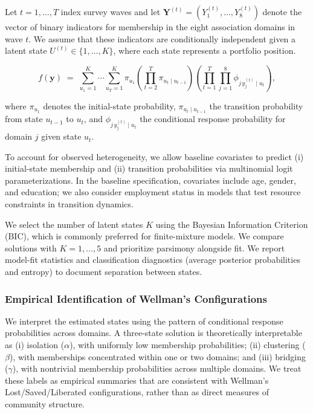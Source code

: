 Let $t=1,\ldots,T$ index survey waves and let $\mathbf{Y}^{(t)}=(Y^{(t)}_{1},\ldots,Y^{(t)}_{8})$ denote the vector of binary indicators for membership in the eight association domains in wave $t$. We assume that these indicators are conditionally independent given a latent state $U^{(t)}\in\{1,\ldots,K\}$, where each state represents a portfolio position.

\begin{equation}
f(\mathbf{y}) \;=\; \sum_{u_1=1}^{K} \cdots \sum_{u_T=1}^{K}
\pi_{u_1}\left(\prod_{t=2}^{T}\pi_{u_t\mid u_{t-1}}\right)
\left(\prod_{t=1}^{T}\prod_{j=1}^{8}\phi_{j\, y_j^{(t)}\mid u_t}\right),
\end{equation}

where $\pi_{u_1}$ denotes the initial-state probability, $\pi_{u_t\mid u_{t-1}}$ the transition probability from state $u_{t-1}$ to $u_t$, and $\phi_{j\, y_j^{(t)}\mid u_t}$ the conditional response probability for domain $j$ given state $u_t$.

To account for observed heterogeneity, we allow baseline covariates to predict (i) initial-state membership and (ii) transition probabilities via multinomial logit parameterizations. In the baseline specification, covariates include age, gender, and education; we also consider employment status in models that test resource constraints in transition dynamics.

We select the number of latent states $K$ using the Bayesian Information Criterion (BIC), which is commonly preferred for finite-mixture models. We compare solutions with $K=1,\ldots,5$ and prioritize parsimony alongside fit. We report model-fit statistics and classification diagnostics (average posterior probabilities and entropy) to document separation between states.

\subsubsection{Empirical Identification of Wellman's Configurations}

We interpret the estimated states using the pattern of conditional response probabilities across domains. A three-state solution is theoretically interpretable as (i) isolation ($\alpha$), with uniformly low membership probabilities; (ii) clustering ($\beta$), with memberships concentrated within one or two domains; and (iii) bridging ($\gamma$), with nontrivial membership probabilities across multiple domains. We treat these labels as empirical summaries that are consistent with Wellman's Lost/Saved/Liberated configurations, rather than as direct measures of community structure.

